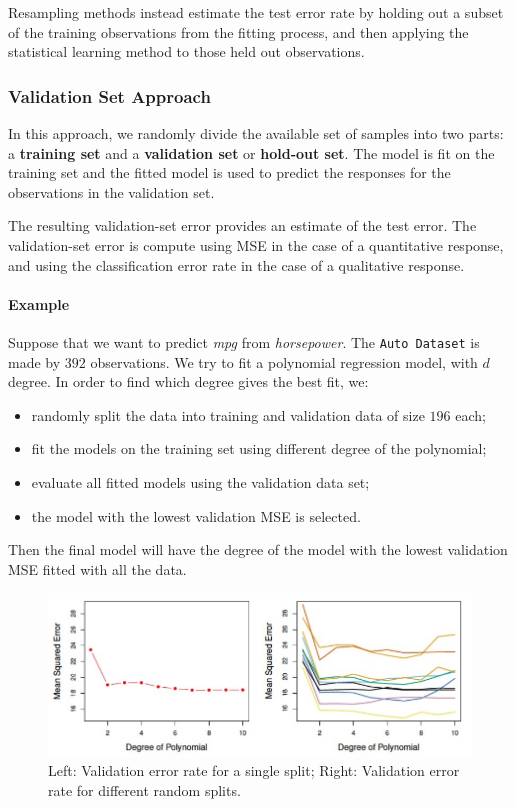 Resampling methods instead estimate the test error rate by holding out a subset of the training observations from the fitting process, and then applying the statistical learning method to those held out observations.

\subsubsection*{Validation Set Approach}
In this approach, we randomly divide the available set of samples into two parts: a \textbf{training set} and a \textbf{validation set} or \textbf{hold-out set}. The model is fit on the training set and the fitted model is used to predict the responses for the observations in the validation set.

The resulting validation-set error provides an estimate of the test error. The validation-set error is compute using MSE in the case of a quantitative response, and using the classification error rate in the case of a qualitative response.

\paragraph*{Example}
Suppose that we want to predict \textit{mpg} from \textit{horsepower}. The \texttt{Auto Dataset} is made by $392$ observations. We try to fit a polynomial regression model, with $d$ degree. In order to find which degree gives the best fit, we:
\begin{itemize}
    \item randomly split the data into training and validation data of size $196$ each;
    \item fit the models on the training set using different degree of the polynomial;
    \item evaluate all fitted models using the validation data set;
    \item the model with the lowest validation MSE is selected.
\end{itemize}
Then the final model will have the degree of the model with the lowest validation MSE fitted with all the data.

\begin{figure}[ht]
    \centering
    \includegraphics[width=0.8\linewidth]{./figures/lec_15_validation_set.png}
    \caption{Left: Validation error rate for a single split; Right: Validation error rate for different random splits.}
    \label{fig:lec_15_validation_set}
\end{figure}

